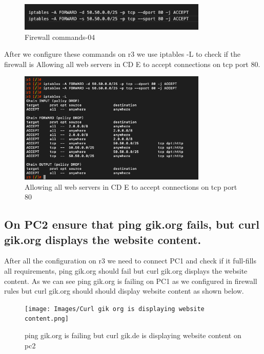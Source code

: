 \begin{figure}[H]
\centering
  \includegraphics[width=0.8\textwidth]{Images/Firewall commands -04.png}
  \caption{Firewall commands-04}
  \label{fig }
\end{figure}
After we configure these commands on r3 we use iptables -L to check if the firewall is Allowing all web servers in CD E to accept connections on tcp port 80.
\begin{figure}[H]
\centering
  \includegraphics[width=0.8\textwidth]{Images/Allow all web servers in CD E to accept connections on tcp port 80.png}
  \caption{Allowing all web servers in CD E to accept connections on tcp port 80}
  \label{fig }
\end{figure}

\subsection{On PC2 ensure that ping gik.org fails, but curl gik.org displays the website content.}
After all the configuration on r3 we need to connect PC1 and check if it full-fills all requirements, ping gik.org should fail but curl gik.org displays the website content.
As we can see ping gik.org is failing on PC1 as we configured in firewall rules but curl gik.org should should display website content as shown below.
\begin{figure}[H]
\centering
  \texttt{[image: Images/Curl gik org is displaying website content.png]}
  \caption{ping gik.org is failing but curl gik.de is displaying website content on pc2}
  \label{fig }
\end{figure}

